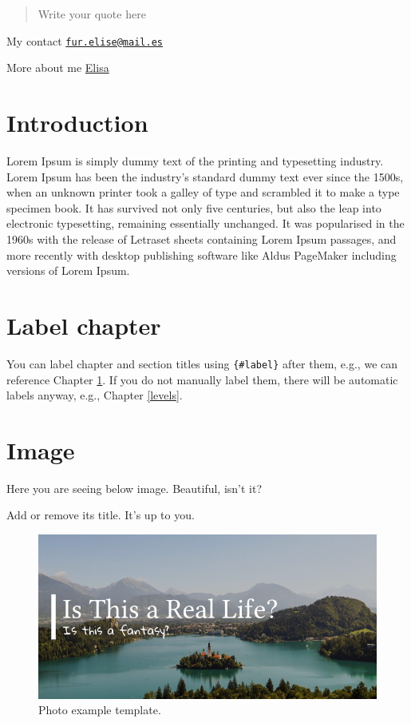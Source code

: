 \documentclass[
  english,
  a4paper,
  openany]{book}
\begin{document}
\begin{quote}
Write your quote here
\end{quote}

My contact \href{mailto:fur.elise@mail.es}{\nolinkurl{fur.elise@mail.es}}

More about me \href{https://about.me/}{Elisa}

\hypertarget{intro}{%
\chapter{Introduction}\label{intro}}

Lorem Ipsum is simply dummy text of the printing and typesetting industry. Lorem Ipsum has been the industry's standard dummy text ever since the 1500s, when an unknown printer took a galley of type and scrambled it to make a type specimen book. It has survived not only five centuries, but also the leap into electronic typesetting, remaining essentially unchanged. It was popularised in the 1960s with the release of Letraset sheets containing Lorem Ipsum passages, and more recently with desktop publishing software like Aldus PageMaker including versions of Lorem Ipsum.

\hypertarget{label-chapter}{%
\chapter{Label chapter}\label{label-chapter}}

You can label chapter and section titles using \texttt{\{\#label\}} after them, e.g., we can reference Chapter \ref{intro}. If you do not manually label them, there will be automatic labels anyway, e.g., Chapter \ref{levels}.

\hypertarget{image}{%
\chapter{Image}\label{image}}

Here you are seeing below image. Beautiful, isn't it?

Add or remove its title. It's up to you.

\begin{figure}

{\centering \includegraphics[width=1\linewidth]{images/photo-example} 

}

\caption{Photo example template.}\label{fig:rmarkdown}
\end{figure}
\end{document}
